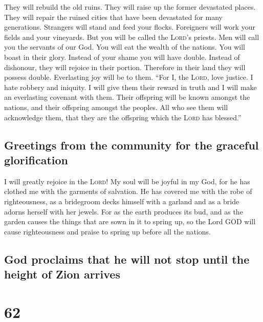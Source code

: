  They will rebuild the old ruins. They will raise up the
former devastated places. They will repair the ruined cities that have
been devastated for many generations.  Strangers will
stand and feed your flocks. Foreigners will work your fields and your
vineyards.  But you will be called the \textsc{Lord}'s
priests. Men will call you the servants of our God. You will eat the
wealth of the nations. You will boast in their glory. 
Instead of your shame you will have double. Instead of dishonour, they
will rejoice in their portion. Therefore in their land they will possess
double. Everlasting joy will be to them.  ``For I, the
\textsc{Lord}, love justice. I hate robbery and iniquity. I will give
them their reward in truth and I will make an everlasting covenant with
them.  Their offspring will be known amongst the nations,
and their offspring amongst the peoples. All who see them will
acknowledge them, that they are the offspring which the \textsc{Lord}
has blessed.''

\hypertarget{greetings-from-the-community-for-the-graceful-glorification}{%
\subsection{Greetings from the community for the graceful
glorification}\label{greetings-from-the-community-for-the-graceful-glorification}}

 I will greatly rejoice in the \textsc{Lord}! My soul
will be joyful in my God, for he has clothed me with the garments of
salvation. He has covered me with the robe of righteousness, as a
bridegroom decks himself with a garland and as a bride adorns herself
with her jewels.  For as the earth produces its bud, and
as the garden causes the things that are sown in it to spring up, so the
Lord GOD will cause righteousness and praise to spring up before all the
nations.

\hypertarget{god-proclaims-that-he-will-not-stop-until-the-height-of-zion-arrives}{%
\subsection{God proclaims that he will not stop until the height of Zion
arrives}\label{god-proclaims-that-he-will-not-stop-until-the-height-of-zion-arrives}}

\hypertarget{section-61}{%
\section{62}\label{section-61}}

